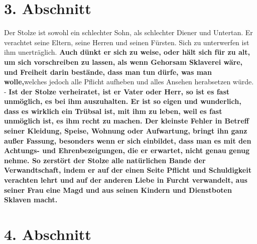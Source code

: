 \section{3. Abschnitt} \label{kap12_ab3}

Der Stolze ist sowohl ein schlechter Sohn, als schlechter
Diener und Untertan.
Er verachtet seine Eltern, seine Herren und seinen
Fürsten. Sich
zu unterwerfen
ist ihm unerträglich. \label{ref:12_03_eitle_menschen_ehe}
\textbf{Auch dünkt er sich zu weise, oder hält sich für zu alt, um
sich vorschreiben zu lassen, als wenn Gehorsam Sklaverei
 wäre,
und Freiheit
darin bestände, dass man tun dürfe, was man wolle,}welches jedoch alle Pflicht
aufheben und alles Ansehen herabsetzen würde. - \textbf{Ist der Stolze
verheiratet, ist
er Vater oder Herr, so ist es fast unmöglich, es bei ihm auszuhalten. Er ist so
eigen und wunderlich, dass es wirklich ein Trübsal ist, mit ihm zu leben, weil
es fast unmöglich ist, es ihm recht zu machen. Der kleinste Fehler in Betreff
seiner Kleidung, Speise, Wohnung oder Aufwartung, bringt ihn ganz außer
Fassung,
besonders wenn er sich einbildet, dass man es mit den Achtungs- und
Ehrenbezeigungen, die er erwartet, nicht genau genug nehme. So zerstört der
Stolze alle natürlichen Bande der Verwandtschaft, indem er
auf der einen Seite
Pflicht und Schuldigkeit verachten lehrt und auf der anderen
Liebe in Furcht
verwandelt, aus seiner Frau eine Magd und aus seinen
Kindern und Dienstboten
Sklaven macht.}

\section{4. Abschnitt} \label{kap12_ab4}

